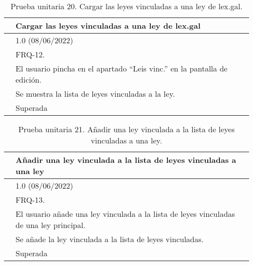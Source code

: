 \begin{table}[H]
\begin{center}
\begin{tabular}{|p{3cm}|p{10cm}|} \hline
\centering {\bf PU-20} & Cargar las leyes vinculadas a una ley de lex.gal  \\ \hline\hline
\centering {\bf Versión} & 1.0 (08/06/2022) \\ \hline
\centering {\bf Dependencias} & FRQ-12. \\ \hline
\centering {\bf Descripción} &  El usuario pincha en el apartado ``Leis vinc.'' en la pantalla de edición. \\ \hline
\centering {\bf Criterio de aceptación} & Se muestra la lista de leyes vinculadas a la ley. \\ \hline
\centering {\bf Estado} & Superada \\ \hline
\end{tabular}
\caption{Prueba unitaria 20. Cargar las leyes vinculadas a una ley de lex.gal.}
\label{enlacePU20}
\end{center}
\end{table}

\begin{table}[H]
\begin{center}
\begin{tabular}{|p{3cm}|p{10cm}|} \hline
\centering {\bf PU-21} & Añadir una ley vinculada a la lista de leyes vinculadas a una ley  \\ \hline\hline
\centering {\bf Versión} & 1.0 (08/06/2022) \\ \hline
\centering {\bf Dependencias} & FRQ-13. \\ \hline
\centering {\bf Descripción} &  El usuario añade una ley vinculada a la lista de leyes vinculadas de una ley principal. \\ \hline
\centering {\bf Criterio de aceptación} & Se añade la ley vinculada a la lista de leyes vinculadas. \\ \hline
\centering {\bf Estado} & Superada \\ \hline
\end{tabular}
\caption{Prueba unitaria 21. Añadir una ley vinculada a la lista de leyes vinculadas a una ley.}
\label{enlacePU21}
\end{center}
\end{table}

